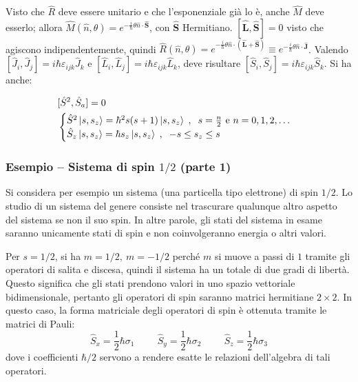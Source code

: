 \documentclass[11pt, a4paper]{scrartcl} %
\numberwithin{equation}{subsection}
\theoremstyle{style2}
\theoremstyle{style1}
\newenvironment{boxenv}[1][]{
    \begin{eqbox}[#1]
    }{
   \end{eqbox}
}
\begin{document}
Visto che $\hat{R}$ deve essere unitario e che l'esponenziale gi\`a lo \`e, anche $\hat{M}$ deve esserlo; allora $\hat{M}(\hat{n},\theta ) = e^{- \frac{i}{\hbar } \theta  \hat{n} \cdot \hat{\mathbf{S} } } $, con $\hat{\mathbf{S} }$ Hermitiano.
$[\hat{\mathbf{L} }, \hat{\mathbf{S} }]= 0$ visto che agiscono indipendentemente, quindi $\hat{R}(\hat{n},\theta ) = e^{ - \frac{i}{\hbar } \theta  \hat{n}\cdot (\hat{\mathbf{L} }+ \hat{\mathbf{S} })}\equiv e^{ - \frac{i}{\hbar } \theta  \hat{n}\cdot \hat{\mathbf{J} }}$.
Valendo $[\hat{J}_i, \hat{J}_j] = i\hbar \varepsilon _{ijk} \hat{J}_k$ e $[\hat{L}_i, \hat{L}_j] = i \hbar \varepsilon _{ijk} \hat{L}_k$, deve risultare $[\hat{S}_i , \hat{S}_j ] = i\hbar \varepsilon _{ijk} \hat{S}_k$. Si ha anche:
\begin{boxenv}[]
\begin{equation}
\begin{split}
	&[\hat{S}^2 , \hat{S}_a] = 0\\
	&\begin{cases}
		\hat{S}^2 \ket{s ,s_z} = \hbar ^2 s(s+1) \ket{s, s_z}\hspace{.1cm} , \hspace{.2cm} s = \frac{n}{2} \text{ e } n = 0,1,2,\ldots\\
		\hat{S}_z \ket{s,s_z} = \hbar s_z \ket{s,s_z} \hspace{.1cm} , \hspace{.2cm} -s\le s_z \le s
	\end{cases}
\end{split}
\end{equation}
\end{boxenv}
\subsubsection{Esempio -- Sistema di spin $1 / 2$ (parte 1)}

Si considera per esempio un sistema (una particella tipo elettrone) di spin $1 / 2$. 
Lo studio di un sistema del genere consiste nel trascurare qualunque altro aspetto del sistema se non il suo spin.
In altre parole, gli stati del sistema in esame saranno unicamente stati di spin e non coinvolgeranno energia o altri valori.

Per $s= 1/2$, si ha $m = 1/2, \ m = -1 / 2 $ perch\'e $m$ si muove a passi di $1$ tramite gli operatori di salita e discesa, quindi il sistema ha un totale di due gradi di libert\`a.
Questo significa che gli stati prendono valori in uno spazio vettoriale bidimensionale, pertanto gli operatori di spin saranno matrici hermitiane $2\times 2$.
In questo caso, la forma matriciale degli operatori di spin \`e ottenuta tramite le matrici di Pauli:
\begin{equation}
	\hat{S}_x = \frac{1}{2}\hbar \sigma _1\hspace{1cm} \hat{S}_y = \frac{1}{2}\hbar \sigma _2 \hspace{1cm} \hat{S}_z = \frac{1}{2}\hbar \sigma _3
\end{equation}
dove i coefficienti $\hbar  / 2$ servono a rendere esatte le relazioni dell'algebra di tali operatori. 
\end{document}
